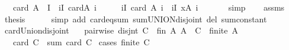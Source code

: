 \begin{isabellebody}
\ \ \ {\isachardoublequoteopen}card\ {\isacharparenleft}{\kern0pt}{\isasymUnion}{\isacharparenleft}{\kern0pt}A\ {\isacharbackquote}{\kern0pt}\ I{\isacharparenright}{\kern0pt}{\isacharparenright}{\kern0pt}\ {\isacharequal}{\kern0pt}\ {\isacharparenleft}{\kern0pt}{\isasymSum}i{\isasymin}I{\isachardot}{\kern0pt}\ card{\isacharparenleft}{\kern0pt}A\ i{\isacharparenright}{\kern0pt}{\isacharparenright}{\kern0pt}{\isachardoublequoteclose}\isanewline
%
\isadelimproof
%
\endisadelimproof
%
\isatagproof
{}\isamarkupfalse%
\ {\isacharminus}{\kern0pt}\isanewline
\ \ \isamarkupfalse%
\ {\isachardoublequoteopen}{\isacharparenleft}{\kern0pt}{\isasymSum}i{\isasymin}I{\isachardot}{\kern0pt}\ card\ {\isacharparenleft}{\kern0pt}A\ i{\isacharparenright}{\kern0pt}{\isacharparenright}{\kern0pt}\ {\isacharequal}{\kern0pt}\ {\isacharparenleft}{\kern0pt}{\isasymSum}i{\isasymin}I{\isachardot}{\kern0pt}\ {\isasymSum}x{\isasymin}A\ i{\isachardot}{\kern0pt}\ {}{\isacharparenright}{\kern0pt}{\isachardoublequoteclose}\isanewline
\ \ \ \ \isamarkupfalse%
\ simp\isanewline
\ \ \isamarkupfalse%
\ assms\ \isamarkupfalse%
\ {\isacharquery}{\kern0pt}thesis\isanewline
\ \ \ \ \isamarkupfalse%
\ {\isacharparenleft}{\kern0pt}simp\ add{\isacharcolon}{\kern0pt}\ card{\isacharunderscore}{\kern0pt}eq{\isacharunderscore}{\kern0pt}sum\ sum{\isachardot}{\kern0pt}UNION{\isacharunderscore}{\kern0pt}disjoint\ del{\isacharcolon}{\kern0pt}\ sum{\isacharunderscore}{\kern0pt}constant{\isacharparenright}{\kern0pt}\isanewline
{}\isamarkupfalse%
%
\endisatagproof
{\isafoldproof}%
%
\isadelimproof
\isanewline
%
\endisadelimproof
\isanewline
{}\isamarkupfalse%
\ card{\isacharunderscore}{\kern0pt}Union{\isacharunderscore}{\kern0pt}disjoint{\isacharcolon}{\kern0pt}\isanewline
\ \ \ {\isachardoublequoteopen}pairwise\ disjnt\ C{\isachardoublequoteclose}\ \ fin{\isacharcolon}{\kern0pt}\ {\isachardoublequoteopen}{\isasymAnd}A{\isachardot}{\kern0pt}\ A\ {\isasymin}\ C\ {\isasymLongrightarrow}\ finite\ A{\isachardoublequoteclose}\isanewline
\ \ \ {\isachardoublequoteopen}card\ {\isacharparenleft}{\kern0pt}{\isasymUnion}C{\isacharparenright}{\kern0pt}\ {\isacharequal}{\kern0pt}\ sum\ card\ C{\isachardoublequoteclose}\isanewline
%
\isadelimproof
%
\endisadelimproof
%
\isatagproof
{}\isamarkupfalse%
\ {\isacharparenleft}{\kern0pt}cases\ {\isachardoublequoteopen}finite\ C{\isachardoublequoteclose}{\isacharparenright}{\kern0pt}\isanewline

\end{isabellebody}
